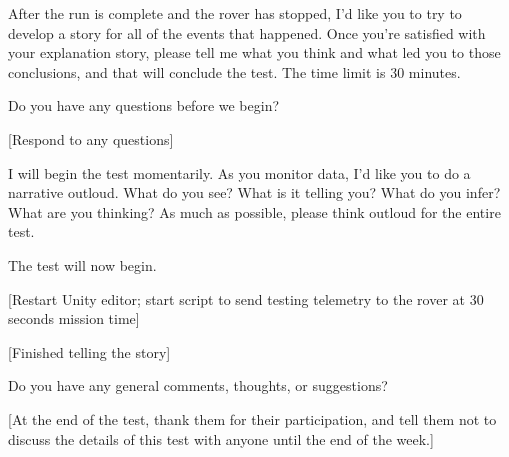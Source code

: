 After the run is complete and the rover has stopped, I'd like you to try to develop a story for all of the events that happened. Once you're satisfied with your explanation story, please tell me what you think and what led you to those conclusions, and that will conclude the test. The time limit is 30 minutes.

Do you have any questions before we begin?

[Respond to any questions]

I will begin the test momentarily. As you monitor data, I'd like you to do a narrative outloud. What do you see? What is it telling you? What do you infer? What are you thinking? As much as possible, please think outloud for the entire test.

The test will now begin.

[Restart Unity editor; start script to send testing telemetry to the rover at 30 seconds mission time]

[Finished telling the story]

Do you have any general comments, thoughts, or suggestions?

[At the end of the test, thank them for their participation, and tell them not to discuss the details of this test with anyone until the end of the week.]